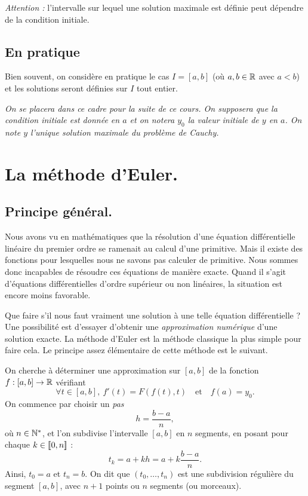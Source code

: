 \emph{Attention :} l'intervalle sur lequel une solution maximale est définie peut dépendre de
la condition initiale.

\subsection{En pratique}

Bien souvent, on considère en pratique le cas $I=[a,b]$ (où $a,b\in\mathbb{R}$ avec $a<b$) et les
solutions seront définies sur $I$ tout entier.

\emph{On se placera dans ce cadre pour la suite de ce cours.
On supposera que la condition initiale est donnée en $a$ et on notera
$y_{0}$ la valeur initiale de $y$ en $a$.
On note $y$ l'unique solution maximale du problème de Cauchy.}

\section{La méthode d'Euler.}

\subsection{Principe général.}

Nous avons vu en mathématiques que la résolution d'une équation différentielle linéaire du premier 
ordre se ramenait au calcul d'une primitive. Mais il existe des fonctions pour lesquelles nous ne 
savons pas calculer de primitive. Nous sommes donc incapables de résoudre ces équations de manière 
exacte. Quand il s'agit d'équations différentielles d'ordre supérieur ou non linéaires, la 
situation est encore moins favorable.


Que faire s'il nous faut vraiment une solution à une telle équation différentielle ? Une 
possibilité est d'essayer d'obtenir une \emph{approximation numérique} d'une solution exacte. La 
méthode d'Euler est la méthode classique la plus simple pour faire cela. Le principe assez 
élémentaire de cette méthode est le suivant.


On cherche à déterminer une approximation sur $[a,b]$ de la fonction $f : [a,b] \to \mathbb{R}$ vérifiant 
\begin{equation*}
  \forall t \in [a,b],~ f'(t) = F(f(t),t) \quad\textrm{et}\quad f(a) = y_0. 
\end{equation*}
On commence par choisir un \emph{pas} 
\begin{equation*}
  h=\frac{b-a}{n},
\end{equation*}
où $n\in\mathbb{N}^{*}$, et l'on subdivise l'intervalle $[a,b]$ en $n$ segments, en posant pour chaque $k\in [\![0,n]\!]$ :
\begin{equation*}
  t_{k} = a + k h = a + k \dfrac{b-a}{n}. 
\end{equation*}
Ainsi, $t_0 = a$ et $t_n = b$. On dit que $(t_0,\dots,t_n)$ est une subdivision régulière du segment $[a,b]$, avec $n+1$ points ou $n$ segments (ou morceaux). 

